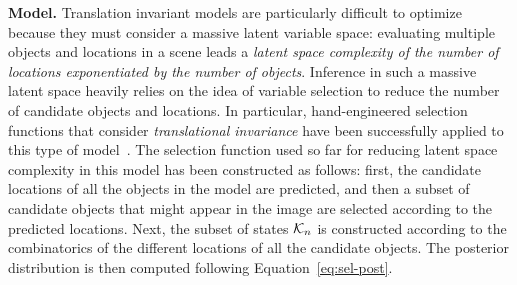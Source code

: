 \textbf{Model.}
%
Translation invariant models are particularly difficult to optimize because they must consider a massive latent variable space: evaluating multiple objects and locations in a scene leads a \textit{latent space complexity of the number of locations exponentiated by the number of objects}.
Inference in such a massive latent space heavily relies on the idea of variable selection to reduce the number of candidate objects and locations. In particular, hand-engineered selection functions that consider \emph{translational invariance} have been successfully applied to this type of model~\citep{DaiLucke2012b,DaiLucke2014,DaiEtAl2013}.
%
The selection function used so far for reducing latent space complexity in this model has been constructed as follows: first, the candidate locations of all the objects in the model are predicted, and then a subset of candidate objects that might appear in the image are selected according to the predicted locations.  Next, the subset of states $\mathcal{K}_{n}$ is constructed according to the combinatorics of the different locations of all the candidate objects.
The posterior distribution is then computed following Equation~\eqref{eq:sel-post}.

